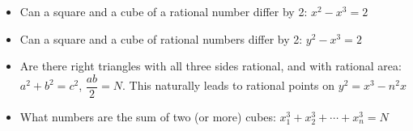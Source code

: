 


{
\begin{frame}
\titlepage
\end{frame}
}



\begin{frame}[plain]
\begin{itemize}
\item Can a square and a cube of a rational number differ by 2: $x^2 - x^3= 2$

\item Can a square and a cube of rational numbers differ by 2: $y^2 - x^3= 2$

\item Are there right triangles with all three sides rational, and with rational area: $a^2+b^2=c^2$, $\dfrac{ab}{2}= N$. This naturally leads to rational points on $y^2= x^3 - n^2 x$

\item What numbers are the sum of two (or more) cubes: $x_1^3+x_2^3+\cdots+x_n^3= N$
\end{itemize}
\end{frame}




